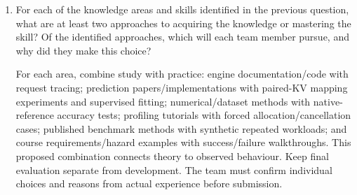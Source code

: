 \documentclass[12pt]{article}
\begin{document}
\begin{enumerate}
\item For each of the knowledge areas and skills identified in the previous
  question, what are at least two approaches to acquiring the knowledge or
  mastering the skill?  Of the identified approaches, which will each team
  member pursue, and why did they make this choice?
\par
For each area, combine study with practice: engine documentation/code
with request tracing; prediction papers/implementations with paired-KV mapping
experiments and supervised fitting; numerical/dataset methods with native-reference
accuracy tests; profiling tutorials with forced allocation/cancellation cases;
published benchmark methods with synthetic repeated workloads; and course
requirements/hazard examples with success/failure walkthroughs. This proposed
combination connects theory to observed behaviour. Keep final evaluation
separate from development. The team must confirm individual choices and reasons
from actual experience before submission.

\end{enumerate}
\end{document}
